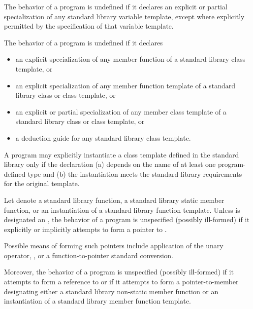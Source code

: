 \pnum
The behavior of a \Cpp{} program is undefined
if it declares an explicit or partial specialization
of any standard library variable template,
except where explicitly permitted by the specification of that variable template.

\pnum
The behavior of a \Cpp{} program is undefined if it declares
\begin{itemize}
\item an explicit specialization of any member function of a standard
library class template, or

\item an explicit specialization of any member function template of a
standard library class or class template, or

\item an explicit or partial specialization of any member class template
of a standard library class or class template, or

\item a deduction guide for any standard library class template.
\end{itemize}

\pnum
A program may explicitly instantiate
a class template defined in the standard library
only if the declaration
(a) depends on the name of at least one program-defined type
and
(b) the instantiation meets the standard library requirements for the
original template.

\pnum
Let  denote
a standard library function,
a standard library static member function,
or an instantiation
of a standard library function template.
Unless  is designated
an ,
the behavior of a \Cpp{} program is unspecified (possibly ill-formed)
if it explicitly or implicitly attempts
to form a pointer
to .
\begin{note}
Possible means of forming such pointers include
application of the unary \tcode{\&} operator,
,
or
a function-to-pointer standard conversion.
\end{note}
Moreover,
the behavior of a \Cpp{} program is unspecified (possibly ill-formed)
if it attempts to form a reference
to 
or
if it attempts to form a pointer-to-member designating
either a standard library non-static member function
or an instantiation of a standard library member function template.

